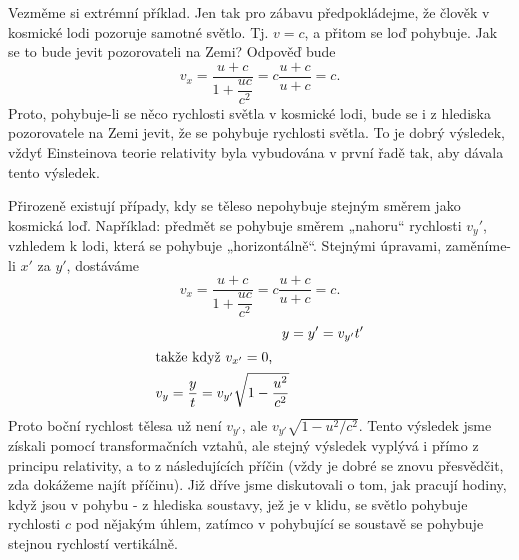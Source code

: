{    Vezměme si extrémní příklad. Jen tak pro zábavu předpokládejme, že člověk v kosmické lodi 
    pozoruje samotné světlo. Tj. \(v = c\), a přitom se loď pohybuje. Jak se to bude jevit 
    pozorovateli na Zemi? Odpověď bude
    \begin{equation*}
      v_x = \dfrac{u + c}{1+\dfrac{uc}{c^2}} = c\dfrac{u+c}{u+c} = c.
    \end{equation*}
    Proto, pohybuje-li se něco rychlosti světla v kosmické lodi, bude se i z hlediska pozorovatele 
    na Zemi jevit, že se pohybuje rychlosti světla. To je dobrý výsledek, vždyť Einsteinova teorie 
    relativity byla vybudována v první řadě tak, aby dávala tento výsledek.
    
    Přirozeně existují případy, kdy se těleso nepohybuje stejným směrem jako kosmická loď. 
    Například: předmět se pohybuje směrem „nahoru“ rychlosti \(v_y'\), vzhledem k lodi, která se 
    pohybuje „horizontálně“. Stejnými úpravami, zaměníme-li \(x'\) za \(y'\), dostáváme
    \begin{equation*}
      v_x = \dfrac{u + c}{1+\dfrac{uc}{c^2}} = c\dfrac{u+c}{u+c} = c.
    \end{equation*}
    \begin{align}
      y &= y'= v_{y'}t'                                     \nonumber \\
      \shortintertext{takže když \(v_{x'} = 0\),} 
      v_y = \frac{y}{t} = v_{y'}\sqrt{1-\dfrac{u^2}{c^2}}   \label{FYZ:eq210}
    \end{align}
    Proto boční rychlost tělesa už není \(v_{y'}\), ale \(v_{y'}\sqrt{1 - u^2/c^2}\). Tento 
    výsledek jsme získali pomocí transformačních vztahů, ale stejný výsledek vyplývá i přímo z 
    principu relativity, a to z následujících příčin (vždy je dobré se znovu přesvědčit, zda 
    dokážeme najít příčinu). Již dříve jsme diskutovali o tom, jak pracují hodiny, když jsou v 
    pohybu - z hlediska soustavy, jež je v klidu, se světlo pohybuje rychlosti \(c\) pod nějakým 
    úhlem, zatímco v pohybující se soustavě se pohybuje stejnou rychlostí vertikálně. 

}
